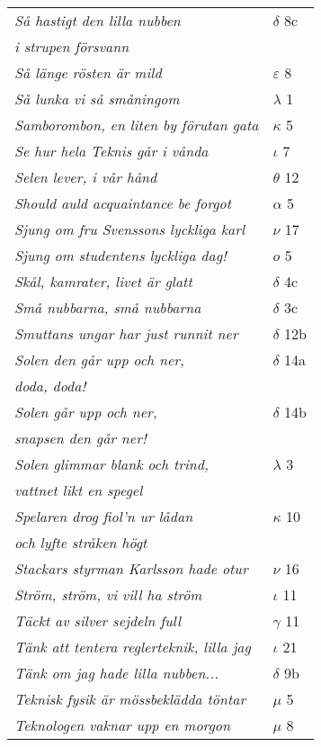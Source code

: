\documentclass[a6paper,10pt]{article}
\begin{document}
\newpage
\setlength{\oddsidemargin}{-0.47in}
\begin{table}[!h]
\begin{tabular}{l l}
\textit{Så hastigt den lilla nubben}	&$\delta$ 8c\\
\textit{i strupen försvann} &\\
\textit{Så länge rösten är mild}	&$\varepsilon$ 8\\
\textit{Så lunka vi så småningom}	&$\lambda$ 1\\
\textit{Samborombon, en liten by förutan gata}	&$\kappa$ 5\\
\textit{Se hur hela Teknis går i vånda}	&$\iota$ 7\\
\textit{Selen lever, i vår hånd}	&$\theta$ 12\\
\textit{Should auld acquaintance be forgot}	&$\alpha$ 5\\
\textit{Sjung om fru Svenssons lyckliga karl}	&$\nu$ 17\\
\textit{Sjung om studentens lyckliga dag!}	&$o$ 5\\
\textit{Skål, kamrater, livet är glatt}	&$\delta$ 4c\\
\textit{Små nubbarna, små nubbarna}	&$\delta$ 3c\\
\textit{Smuttans ungar har just runnit ner}	&$\delta$ 12b\\
\textit{Solen den går upp och ner,}	&$\delta$ 14a\\
\textit{doda, doda!} &\\
\textit{Solen går upp och ner,}	&$\delta$ 14b\\
\textit{snapsen den går ner!} &\\
\textit{Solen glimmar blank och trind,}	&$\lambda$ 3\\
\textit{vattnet likt en spegel} &\\
\textit{Spelaren drog fiol'n ur lådan}	&$\kappa$ 10\\
\textit{och lyfte stråken högt} &\\
\textit{Stackars styrman Karlsson hade otur}	&$\nu$ 16\\
\textit{Ström, ström, vi vill ha ström}	&$\iota$ 11\\
\textit{Täckt av silver sejdeln full}	&$\gamma$ 11\\
\textit{Tänk att tentera reglerteknik, lilla jag}&$\iota$ 21\\
\textit{Tänk om jag hade lilla nubben...}	&$\delta$ 9b\\
\textit{Teknisk fysik är mössbeklädda töntar}	&$\mu$ 5\\
\textit{Teknologen vaknar upp en morgon}    &$\mu$ 8\\
\end{tabular}
\end{table}
\end{document}
